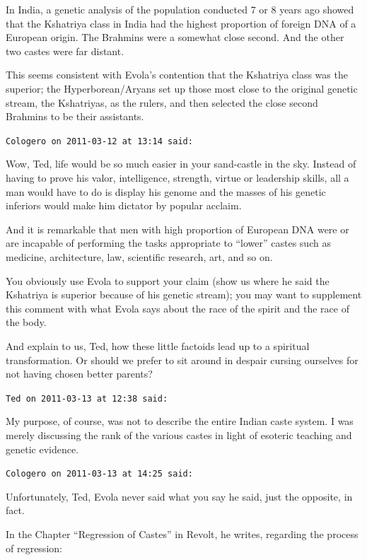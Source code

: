 \begin{footnotesize}
\begin{sffamily}
In India, a genetic analysis of the population conducted 7 or 8 years ago showed that the Kshatriya class in India had the highest proportion of foreign DNA of a European origin. The Brahmins were a somewhat close second. And the other two castes were far distant.

This seems consistent with Evola's contention that the Kshatriya class was the superior; the Hyperborean/Aryans set up those most close to the original genetic stream, the Kshatriyas, as the rulers, and then selected the close second Brahmins to be their assistants.

\hfill

\texttt{Cologero on 2011-03-12 at 13:14 said:}

Wow, Ted, life would be so much easier in your sand-castle in the sky. Instead of having to prove his valor, intelligence, strength, virtue or leadership skills, all a man would have to do is display his genome and the masses of his genetic inferiors would make him dictator by popular acclaim.

And it is remarkable that men with high proportion of European DNA were or are incapable of performing the tasks appropriate to ``lower'' castes such as medicine, architecture, law, scientific research, art, and so on.

You obviously use Evola to support your claim (show us where he said the Kshatriya is superior because of his genetic stream); you may want to supplement this comment with what Evola says about the race of the spirit and the race of the body.

And explain to us, Ted, how these little factoids lead up to a spiritual transformation. Or should we prefer to sit around in despair cursing ourselves for not having chosen better parents?

\hfill

\texttt{Ted on 2011-03-13 at 12:38 said:}

My purpose, of course, was not to describe the entire Indian caste system. I was merely discussing the rank of the various castes in light of esoteric teaching and genetic evidence.

\hfill

\texttt{Cologero on 2011-03-13 at 14:25 said:}

Unfortunately, Ted, Evola never said what you say he said, just the opposite, in fact.

In the Chapter ``Regression of Castes'' in Revolt, he writes, regarding the process of regression:


\end{sffamily}
\end{footnotesize}
